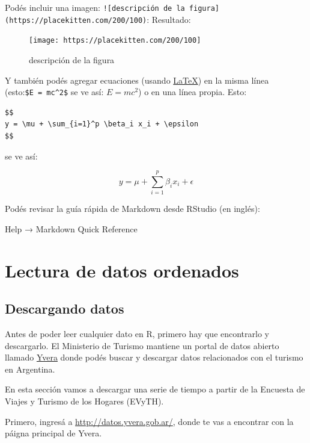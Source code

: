 \documentclass[
  openany]{book}
\begin{document}
Podés incluir una imagen: \texttt{!{[}descripción\ de\ la\ figura{]}(https://placekitten.com/200/100)}: Resultado:

\begin{figure}
\centering
\texttt{[image: https://placekitten.com/200/100]}
\caption{descripción de la figura}
\end{figure}

Y también podés agregar ecuaciones (usando \href{https://es.wikipedia.org/wiki/LaTeX}{LaTeX}) en la misma línea (esto:\texttt{\$E\ =\ mc\^{}2\$} se ve así: \(E = mc^2\)) o en una línea propia.
Esto:

\begin{verbatim}
$$
y = \mu + \sum_{i=1}^p \beta_i x_i + \epsilon
$$
\end{verbatim}

se ve así:

\[
y = \mu + \sum_{i=1}^p \beta_i x_i + \epsilon
\]

Podés revisar la guía rápida de Markdown desde RStudio (en inglés):

Help → Markdown Quick Reference

\hypertarget{lectura-de-datos-ordenados}{%
\chapter{Lectura de datos ordenados}\label{lectura-de-datos-ordenados}}

\hypertarget{descargando-datos}{%
\section{Descargando datos}\label{descargando-datos}}

Antes de poder leer cualquier dato en R, primero hay que encontrarlo y descargarlo.
El Ministerio de Turismo mantiene un portal de datos abierto llamado \href{http://datos.yvera.gob.ar/}{Yvera} donde podés buscar y descargar datos relacionados con el turismo en Argentina.

En esta sección vamos a descargar una serie de tiempo a partir de la Encuesta de Viajes y Turismo de los Hogares (EVyTH).

Primero, ingresá a \url{http://datos.yvera.gob.ar/}, donde te vas a encontrar con la páigna principal de Yvera.
\end{document}
